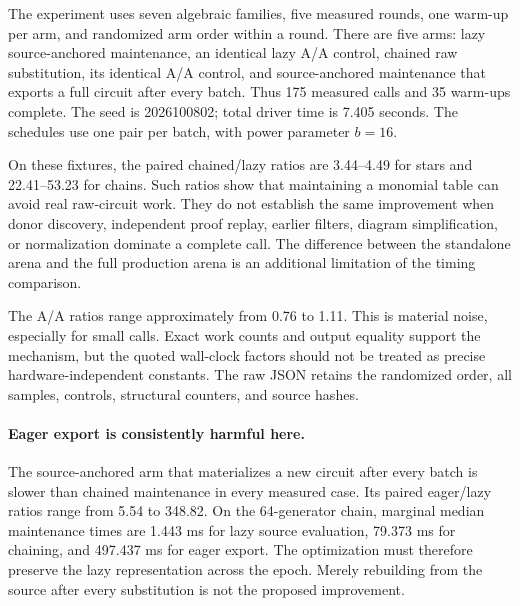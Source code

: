 \documentclass[11pt,letterpaper]{article}
\theoremstyle{definition}
\theoremstyle{remark}\newtheorem{remark}[theorem]{Remark}
\begin{document}
The experiment uses seven algebraic families, five measured rounds, one
warm-up per arm, and randomized arm order within a round. There are five arms:
lazy source-anchored maintenance, an identical lazy A/A control, chained raw
substitution, its identical A/A control, and source-anchored maintenance that
exports a full circuit after every batch. Thus 175 measured calls and 35
warm-ups complete. The seed is 2026100802; total driver time is 7.405 seconds.
The schedules use one pair per batch, with power parameter $b=16$.

\begin{table}[htbp]\centering\small

\caption{Supplied-schedule maintenance only. Times are marginal medians;
C/L and E/L are medians of within-round chained/lazy and eager/lazy ratios.
They need not equal ratios of marginal medians. No entry is an end-to-end
recognition speedup.}
\label{tab:benchmark}
\end{table}

On these fixtures, the paired chained/lazy ratios are 3.44--4.49 for stars
and 22.41--53.23 for chains. Such ratios show that maintaining a monomial table
can avoid real raw-circuit work. They do not establish the same improvement
when donor discovery, independent proof replay, earlier filters, diagram
simplification, or normalization dominate a complete call. The difference
between the standalone arena and the full production arena is an additional
limitation of the timing comparison.

\begin{table}[htbp]\centering\small

\caption{A/A controls and allocated chained nodes. Submillisecond controls
show appreciable timing noise; all retained samples are reported, not replaced
by selected reruns.}
\label{tab:controls}
\end{table}

The A/A ratios range approximately from 0.76 to 1.11. This is material noise,
especially for small calls. Exact work counts and output equality support the
mechanism, but the quoted wall-clock factors should not be treated as precise
hardware-independent constants. The raw JSON retains the randomized order,
all samples, controls, structural counters, and source hashes.

\paragraph{Eager export is consistently harmful here.}
The source-anchored arm that materializes a new circuit after every batch is
slower than chained maintenance in every measured case. Its paired eager/lazy
ratios range from 5.54 to 348.82. On the 64-generator chain, marginal median
maintenance times are 1.443 ms for lazy source evaluation, 79.373 ms for
chaining, and 497.437 ms for eager export. The optimization must therefore
preserve the lazy representation across the epoch. Merely rebuilding from the
source after every substitution is not the proposed improvement.
\end{document}
